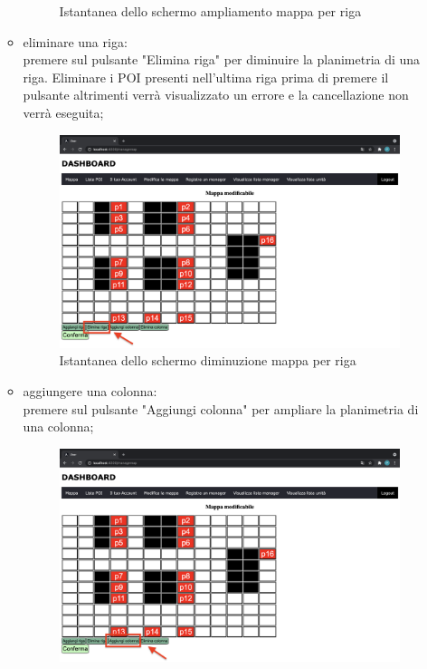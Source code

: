 \begin{itemize}
\begin{itemize}
\begin{figure}[H]
                \caption{Istantanea dello schermo ampliamento mappa per riga}
            \end{figure}
            \item eliminare una riga: \\premere sul pulsante "Elimina riga" per diminuire la planimetria di una riga. Eliminare i POI presenti nell'ultima riga prima di premere il pulsante altrimenti verrà visualizzato un errore e la cancellazione non verrà eseguita;
            \begin{figure}[H]
                \centering
                \includegraphics[scale=0.12]{res/images/modificamappa2.png}
                \caption{Istantanea dello schermo diminuzione mappa per riga}
            \end{figure}
            \item aggiungere una colonna: \\premere sul pulsante "Aggiungi colonna" per ampliare la planimetria di una colonna;
            \begin{figure}[H]
                \centering
                \includegraphics[scale=0.12]{res/images/modificamappa3.png}

\end{figure}
\end{itemize}
\end{itemize}
